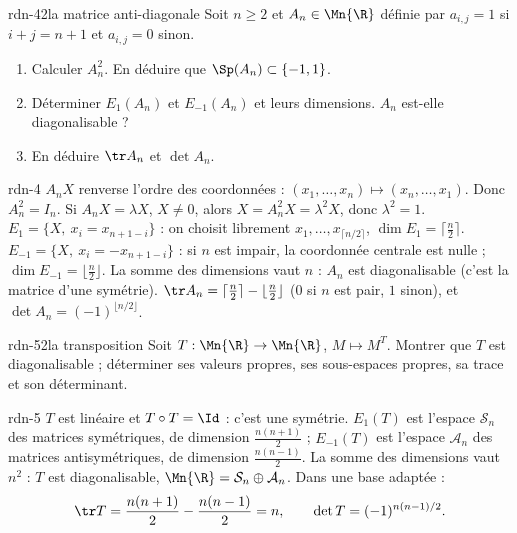 \begin{exo}{rdn-4}{2}{la matrice anti-diagonale}
Soit $n\geq2$ et $A_n\in\Mn{\R}$ définie par $a_{i,j}=1$ si $i+j=n+1$ et $a_{i,j}=0$ sinon.
\begin{enumerate}
\item Calculer $A_n^2$. En déduire que $\Sp(A_n)\subset\{-1,1\}$.
\item Déterminer $E_1(A_n)$ et $E_{-1}(A_n)$ et leurs dimensions. $A_n$ est-elle diagonalisable ?
\item En déduire $\tr A_n$ et $\det A_n$.
\end{enumerate}
\end{exo}
\begin{corrige}{rdn-4}
 $A_nX$ renverse l'ordre des coordonnées : $(x_1,\dots,x_n)\mapsto(x_n,\dots,x_1)$. Donc $A_n^2=I_n$. Si $A_nX=\lambda X$,
$X\neq0$, alors $X=A_n^2X=\lambda^2X$, donc $\lambda^2=1$.
 $E_1=\{X,\ x_i=x_{n+1-i}\}$ : on choisit librement $x_1,\dots,x_{\lceil n/2\rceil}$, $\dim E_1=\lceil\frac n2\rceil$.
$E_{-1}=\{X,\ x_i=-x_{n+1-i}\}$ : si $n$ est impair, la coordonnée centrale est nulle ; $\dim E_{-1}=\lfloor\frac n2\rfloor$.
La somme des dimensions vaut $n$ : $A_n$ est diagonalisable (c'est la matrice d'une symétrie).
 $\tr A_n=\lceil\frac n2\rceil-\lfloor\frac n2\rfloor$ ($0$ si $n$ est pair, $1$ sinon), et $\det A_n=(-1)^{\lfloor n/2\rfloor}$.
\end{corrige}

\begin{exo}{rdn-5}{2}{la transposition}
Soit $T:\Mn{\R}\to\Mn{\R}$, $M\mapsto M^T$. Montrer que $T$ est diagonalisable ; déterminer ses valeurs propres, ses
sous-espaces propres, sa trace et son déterminant.
\end{exo}
\begin{corrige}{rdn-5}
$T$ est linéaire et $T\circ T=\Id$ : c'est une symétrie. $E_1(T)$ est l'espace $\mathcal S_n$ des matrices symétriques, de dimension
$\frac{n(n+1)}2$ ; $E_{-1}(T)$ est l'espace $\mathcal A_n$ des matrices antisymétriques, de dimension $\frac{n(n-1)}2$. La somme des
dimensions vaut $n^2$ : $T$ est diagonalisable, $\Mn{\R}=\mathcal S_n\oplus\mathcal A_n$. Dans une base adaptée :
\[\tr T=\frac{n(n+1)}2-\frac{n(n-1)}2=n,\qquad\det T=(-1)^{n(n-1)/2}.\]
\end{corrige}

